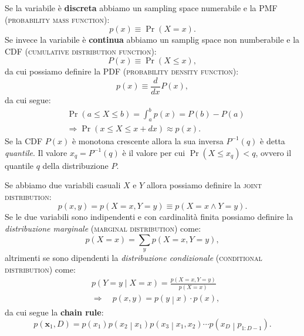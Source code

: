 \documentclass[10pt]{article}
\renewcommand{\vec}[1]{\boldsymbol{#1}}
\newcommand{\im}[1]{\textsc{#1}}
\newcommand{\et}{\wedge}
\newcommand{\cond}{\middle|}
\newcommand{\pare}[1]{
	\ensuremath{\left(#1\right)}
}
\newcommand{\deriv}[3][]{
	\ensuremath{\frac{d^{#1}{#2}}{d{#3}^{#1}}}
}
\theoremstyle{definition}
\theoremstyle{definition}
\DeclareMathOperator{\pr}{Pr}
\begin{document}
Se la variabile è \textbf{discreta} abbiamo un sampling space numerabile e la PMF (\im{probability mass function}):
\begin{equation}
p\pare{x} \equiv \pr\pare{X = x}.
\end{equation}
Se invece la variabile è \textbf{continua} abbiamo un samplig space non numberabile e la CDF (\im{cumulative distribution function}):
\begin{equation}
P\pare{x} \equiv \pr\pare{X \leq x},
\end{equation}
da cui possiamo definire la PDF (\im{probability density function}):
\begin{equation}
p\pare{x} \equiv \deriv{}{x}P\pare{x},
\end{equation}
da cui segue:
\begin{align}
&\pr\pare{a \leq X \leq b} = \int_a^b p\pare{x} = P\pare{b} - P\pare{a} \\
&\Longrightarrow \pr\pare{x \leq X \leq x + dx} \approx p\pare{x}.
\end{align}
Se la CDF $P\pare{x}$ è monotona crescente allora la sua inversa $P^{-1}(q)$ è detta \textit{quantile}. Il valore $x_q = P^{-1}\pare{q}$ è il valore per cui $\pr\pare{X\leq x_q} < q$, ovvero il quantile $q$ della distribuzione $P$.

Se abbiamo due variabili casuali $X$ e $Y$ allora possiamo definire la \im{joint distribution}:
\begin{equation}
p\pare{x, y} = p\pare{X = x, Y = y} \equiv p\pare{X = x\et Y = y}.
\end{equation}
Se le due variabili sono indipendenti e con cardinalità finita possiamo definire la \textit{distribuzione marginale} (\im{marginal distribution}) come:
\begin{equation}
p\pare{X = x} = \sum_y p\pare{X=x, Y=y},
\end{equation}
altrimenti se sono dipendenti la \textit{distribuzione condizionale} (\im{conditional distribution}) come:
\begin{equation}
\begin{split}
&p\pare{Y=y\cond X=x} = \frac{p\pare{X=x, Y=y}}{p\pare{X=x}} \\
&\Longrightarrow\quad p\pare{x, y} = p\pare{y\cond x}\cdot p\pare{x},
\end{split}
\end{equation}
da cui segue la \textbf{chain rule}:
\begin{equation}
p\pare{\vec{x}_1,D} = p\pare{x_1} p\pare{x_2\cond x_1} p\pare{x_3\cond x_1, x_2}\cdots p\pare{x_D\cond p_{1: D-1}}.
\end{equation}
\end{document}

